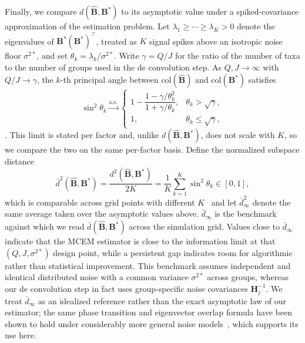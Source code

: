 Finally, we compare $d(\hat{\mathbf{B}}, \mathbf{B}^{*})$ to its asymptotic value under a spiked-covariance approximation of the estimation problem. Let $\lambda_1 \ge \cdots \ge \lambda_K > 0$ denote the eigenvalues of $\mathbf{B}^{*}(\mathbf{B}^{*})^\top$, treated as $K$ signal spikes above an isotropic noise floor $\sigma^{2*}$, and set $\theta_k = \lambda_k/\sigma^{2*}$. Write $\gamma = Q/J$ for the ratio of the number of taxa to the number of groups used in the de convolution step. As $Q, J \to \infty$ with $Q/J \to \gamma$, the $k$-th principal angle between $\mathrm{col}(\hat{\mathbf{B}})$ and $\mathrm{col}(\mathbf{B}^{*})$ satisfies
\begin{equation}
    \sin^2\theta_k \xrightarrow{\mathrm{a.s.}}
    \begin{cases}
        1 - \dfrac{1 - \gamma/\theta_k^2}{1 + \gamma/\theta_k}, & \theta_k > \sqrt{\gamma}, \\[6pt]
        1, & \theta_k \le \sqrt{\gamma},
    \end{cases}
\end{equation}
\citep{Paul2007}. This limit is stated per factor and, unlike $d(\hat{\mathbf{B}}, \mathbf{B}^{*})$, does not scale with $K$, so we compare the two on the same per-factor basis. Define the normalized subspace distance
\begin{equation}
    \bar{d}^2(\hat{\mathbf{B}}, \mathbf{B}^{*}) = \frac{d^2(\hat{\mathbf{B}}, \mathbf{B}^{*})}{2K} = \frac{1}{K}\sum_{k=1}^K \sin^2\theta_k \in [0,1],
    \label{eq:average-b-distance}
\end{equation}
which is comparable across grid points with different $K$~\citep{Krzanowski1979} and let $\bar{d}_\infty^2$ denote the same average taken over the asymptotic values above. $\bar{d}_\infty$ is the benchmark against which we read $\bar{d}(\hat{\mathbf{B}}, \mathbf{B}^{*})$ across the simulation grid. Values close to $\bar{d}_\infty$ indicate that the MCEM estimator is close to the information limit at that $(Q, J, \sigma^{2*})$ design point, while a persistent gap indicates room for algorithmic rather than statistical improvement. This benchmark assumes independent and identical distributed noise with a common variance $\sigma^{2*}$ across groups, whereas our de convolution step in fact uses group-specific noise covariances $\mathbf{H}_j^{-1}$. We treat $\bar{d}_\infty$ as an idealized reference rather than the exact asymptotic law of our estimator; the same phase transition and eigenvector overlap formula have been shown to hold under considerably more general noise models~\citep{BenaychGeorges2011}, which supports its use here.

